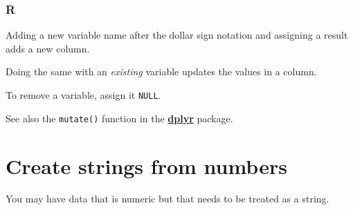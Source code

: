 \documentclass[
]{book}
\newenvironment{Shaded}{\begin{snugshade}}{\end{snugshade}}
\newcommand{\CommentTok}[1]{\textcolor[rgb]{0.56,0.35,0.01}{\textit{#1}}}
\newcommand{\ConstantTok}[1]{\textcolor[rgb]{0.00,0.00,0.00}{#1}}
\newcommand{\DecValTok}[1]{\textcolor[rgb]{0.00,0.00,0.81}{#1}}
\newcommand{\FloatTok}[1]{\textcolor[rgb]{0.00,0.00,0.81}{#1}}
\newcommand{\NormalTok}[1]{#1}
\newcommand{\OtherTok}[1]{\textcolor[rgb]{0.56,0.35,0.01}{#1}}
\newcommand{\SpecialCharTok}[1]{\textcolor[rgb]{0.00,0.00,0.00}{#1}}
\begin{document}
\hypertarget{r-21}{%
\subsubsection*{R}\label{r-21}}

Adding a new variable name after the dollar sign notation and assigning a result adds a new column.

\begin{Shaded}
\end{Shaded}

Doing the same with an \emph{existing} variable updates the values in a column.

\begin{Shaded}
\end{Shaded}

To remove a variable, assign it \texttt{NULL}.

\begin{Shaded}
\end{Shaded}

See also the \texttt{mutate()} function in the \href{https://dplyr.tidyverse.org/}{\textbf{dplyr}} package.

\hypertarget{create-strings-from-numbers}{%
\section{Create strings from numbers}\label{create-strings-from-numbers}}

You may have data that is numeric but that needs to be treated as a string.
\end{document}
